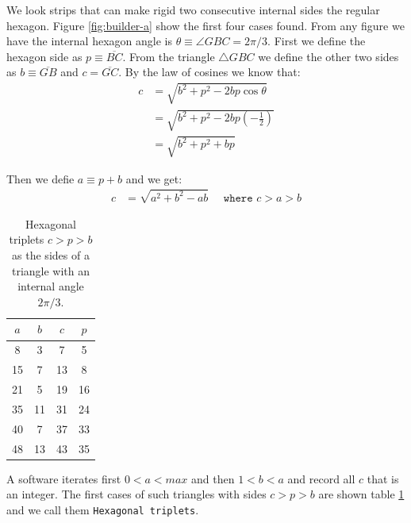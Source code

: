 \documentclass[11pt]{article}
\begin{document}
We look strips that can make rigid two consecutive internal sides the regular hexagon. Figure \ref{fig:builder-a} show the first four cases found. From any figure we have the internal hexagon angle is $\theta \equiv \angle{GBC} = 2\pi/3$. First we define the hexagon side as $p \equiv \overline{BC}$. From the triangle $\triangle{GBC}$ we define the other two sides as $b \equiv \overline{GB}$ and $c = \overline{GC}$. By the law of cosines we know that:
\begin{align}
c &= \sqrt{b^2 + p^2 - 2bp\cos\theta} \nonumber\\
 &= \sqrt{b^2 + p^2 - 2bp\left(-\frac{1}{2}\right)} \nonumber\\
 &= \sqrt{b^2 + p^2 + bp} \label{eq:triplet-cpb}
\end{align}

Then we defie $a \equiv p + b$ and we get:
\begin{align}
c &= \sqrt{a^2 + b^2 - ab} \quad \texttt{ where } c > a > b
\end{align}

\begin{table}[H]
\begin{center}
\begin{tabular}{| c | c c c |} 
 \hline
 $a$ & $b$ & $c$ & $p$ \\ [0.5ex] 
 \hline\hline
  8 &  3 &  7 &  5 \\ \hline
 15 &  7 & 13 &  8 \\ \hline
 21 &  5 & 19 & 16 \\ \hline
 35 & 11 & 31 & 24 \\ \hline
 40 &  7 & 37 & 33 \\ \hline
 48 & 13 & 43 & 35 \\ \hline
\end{tabular}
\caption{Hexagonal triplets $c > p > b$ as the sides of a triangle with an internal angle $2\pi/3$.}
\label{tbl:triplets}
\end{center}
\end{table}

A software iterates first $0 < a < max$ and then $1 < b < a$ and record all $c$ that is an integer. The first cases of such triangles with sides $c > p > b$ are shown table \ref{tbl:triplets} and we call them \texttt{Hexagonal triplets}.
\end{document}
